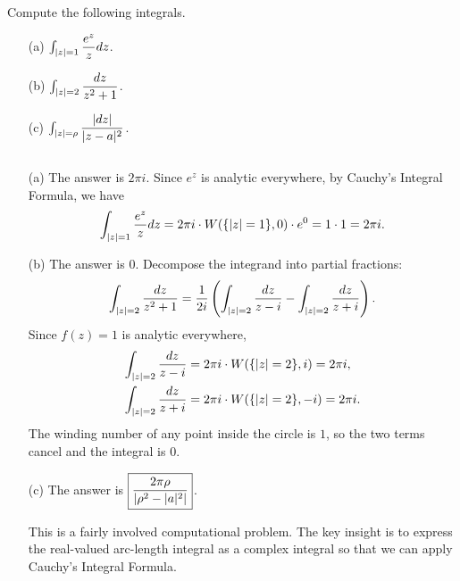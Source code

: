 \begin{exercise}
Compute the following integrals.
\begin{enumerate}
\item[(a)] $\int_{\lvert z \rvert=1}\dfrac{e^z}{z}dz$.
\item[(b)] $\int_{\lvert z \rvert=2} \dfrac{dz}{z^2+1}$.
\item[(c)] $\int_{\lvert z \rvert=\rho}\dfrac{\lvert dz \rvert}{\lvert z-a \rvert^2}$.
\end{enumerate}

\begin{sol}
$ $
\begin{enumerate}
\item[(a)] The answer is $\boxed{2\pi i}$. Since $e^z$ is analytic everywhere, by Cauchy's Integral Formula, we have $$\int_{\lvert z \rvert=1}\dfrac{e^z}{z}dz=2\pi i \cdot W(\{\lvert z \rvert=1\},0) \cdot e^0=1 \cdot 1=2\pi i.$$
\item[(b)] The answer is $\boxed{0}$. Decompose the integrand into partial fractions: $$\int_{\lvert z \rvert=2} \dfrac{dz}{z^2+1}=\dfrac{1}{2i}\left(\int_{\lvert z \rvert=2}\dfrac{dz}{z-i}-\int_{\lvert z \rvert=2}\dfrac{dz}{z+i}\right).$$ Since $f(z)=1$ is analytic everywhere,
\begin{align*}
\int_{\lvert z \rvert=2}\dfrac{dz}{z-i} &= 2\pi i \cdot W(\{\lvert z \rvert=2\},i)=2\pi i,\\
\int_{\lvert z \rvert=2}\dfrac{dz}{z+i} &= 2\pi i \cdot W(\{\lvert z \rvert=2\},-i)=2\pi i.
\end{align*}
The winding number of any point inside the circle is $1$, so the two terms cancel and the integral is $0$.
\item[(c)] The answer is $\boxed{\dfrac{2\pi \rho}{\lvert \rho^2-\lvert a \rvert^2 \rvert}}$.

This is a fairly involved computational problem. The key insight is to express the real-valued arc-length integral as a complex integral so that we can apply Cauchy's Integral Formula.


\end{enumerate}
\end{sol}
\end{exercise}
